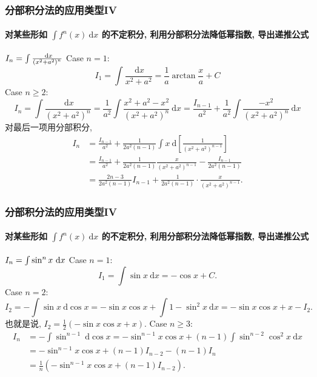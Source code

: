 \documentclass[
10pt,
aspectratio=43,
]{beamer}
\begin{document}
\begin{frame}
	\frametitle{分部积分法的应用类型IV}
	\framesubtitle{对某些形如 $\int f^n(x) \mathrm{~d} x$ 的不定积分, 利用分部积分法降低幂指数, 导出递推公式}
	\everymath{\displaystyle}
	{\small
		\begin{exampleblock}{$\color{black}I_n=\int \frac{\mathrm{~d} x}{\left(x^2+a^2\right)^n}$}
			Case $n=1$:
			$$
				I_1=\int \frac{\mathrm{~d} x}{x^2+a^2}=\frac{1}{a} \arctan \frac{x}{a}+C
			$$
			Case $n\ge2$:
			$$
				I_n=\int \frac{\mathrm{~d} x}{\left(x^2+a^2\right)^n}=\frac{1}{a^2} \int \frac{x^2+a^2-x^2}{\left(x^2+a^2\right)^n} \mathrm{~d} x=\frac{I_{n-1}}{a^2}+\frac{1}{a^2} \int \frac{-x^2}{\left(x^2+a^2\right)^n} \mathrm{~d} x
			$$
			对最后一项用分部积分,
			$$
				\begin{aligned}
					I_n & =\frac{I_{n-1}}{a^2}+\frac{1}{2 a^2(n-1)} \int x \mathrm{~d}\left[\frac{1}{\left(x^2+a^2\right)^{n-1}}\right] \\
					    & =\frac{I_{n-1}}{a^2}+\frac{1}{2 a^2(n-1)} \frac{x}{\left(x^2+a^2\right)^{n-1}}-\frac{I_{n-1}}{2 a^2(n-1)}     \\
					    & =\frac{2 n-3}{2 a^2(n-1)} I_{n-1}+\frac{1}{2 a^2(n-1)} \cdot \frac{x}{\left(x^2+a^2\right)^{n-1}}.
				\end{aligned}
			$$
		\end{exampleblock}
	}
\end{frame}

\begin{frame}
	\frametitle{分部积分法的应用类型IV}
	\framesubtitle{对某些形如 $\int f^n(x) \mathrm{~d} x$ 的不定积分, 利用分部积分法降低幂指数, 导出递推公式}
	\everymath{\displaystyle}
	{\small
		\begin{exampleblock}{$\color{black}I_n=\int \sin^n x\mathrm{~d} x$}
			Case $n=1$:
			$$
				I_1=\int \sin x\mathrm{~d}x = -\cos x+C.
			$$
			Case $n=2$:
			$$
				I_2=-\int\sin x\mathrm{~d}\cos x =-\sin x\cos x+ \int 1-\sin^2x\mathrm{~d}x=-\sin x\cos x+x -I_2.
			$$
			也就是说, $I_2=\frac{1}{2}\left(-\sin x\cos x +x\right)$. Case $n\ge3$:
			$$
				\begin{aligned}
					I_n & =-\int\sin ^{n-1}\mathrm{~d}\cos x  =-\sin^{n-1}x\cos x+(n-1)\int \sin^{n-2}\cos^2x\mathrm{~d}x \\
					    & =-\sin^{n-1}x\cos x+(n-1)I_{n-2}-(n-1)I_{n}                                                     \\
					    & =\frac{1}{n}\left(-\sin^{n-1}x\cos x +(n-1)I_{n-2}\right).
				\end{aligned}
			$$
		\end{exampleblock}
	}
\end{frame}
\end{document}
